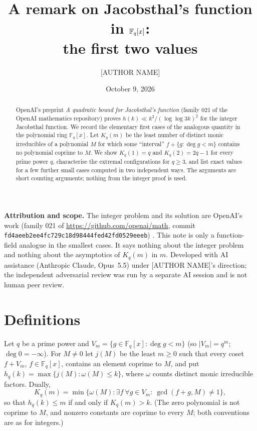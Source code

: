 \documentclass[11pt]{amsart}
\title[{Jacobsthal's function in $\F_q[x]$: the first two values}]{A remark on Jacobsthal's function in $\F_q[x]$: \\ the first two values}
\author{[AUTHOR NAME]}
\date{October 9, 2026}
\theoremstyle{remark}
\newcommand{\F}{\mathbb F}
\begin{document}
\begin{abstract}
OpenAI's preprint \emph{A quadratic bound for Jacobsthal's function} (family 021 of the OpenAI
mathematics repository) proves $h(k)\ll k^2/(\log\log 3k)^2$ for the integer Jacobsthal function.
We record the elementary first cases of the analogous quantity in the polynomial ring $\F_q[x]$.
Let $K_q(m)$ be the least number of distinct monic irreducibles of a polynomial $M$ for which some
``interval'' $f+\{g:\deg g<m\}$ contains no polynomial coprime to $M$. We show $K_q(1)=q$ and
$K_q(2)=2q-1$ for every prime power $q$, characterise the extremal configurations for $q\ge3$, and
list exact values for a few further small cases computed in two independent ways. The arguments are
short counting arguments; nothing from the integer proof is used.
\end{abstract}
\maketitle

\noindent\textbf{Attribution and scope.} The integer problem and its solution are OpenAI's work
(family 021 of \url{https://github.com/openai/math}, commit
\nolinkurl{fd4aeeb2ee4fc729c18d98444fed42fd0529eeeb}) \cite{oai}. This note is only a function-field
analogue in the smallest cases. It says nothing about the integer problem and nothing about the
asymptotics of $K_q(m)$ in $m$. Developed with AI assistance (Anthropic Claude, Opus~5.5) under
[AUTHOR NAME]'s direction; the independent adversarial review was run by a separate AI session and
is not human peer review.

\section{Definitions}
Let $q$ be a prime power and $V_m=\{g\in\F_q[x]:\deg g<m\}$ (so $|V_m|=q^m$; $\deg 0=-\infty$).
For $M\ne0$ let $j(M)$ be the least $m\ge0$ such that every coset $f+V_m$, $f\in\F_q[x]$, contains
an element coprime to $M$, and put $h_q(k)=\max\{j(M):\omega(M)\le k\}$, where $\omega$ counts
distinct monic irreducible factors. Dually,
\[
 K_q(m)=\min\{\omega(M): \exists f\ \forall g\in V_m:\ \gcd(f+g,M)\ne1\},
\]
so that $h_q(k)\le m$ if and only if $K_q(m)>k$. (The zero polynomial is not coprime to $M$, and
nonzero constants are coprime to every $M$; both conventions are as for integers.)
\end{document}
